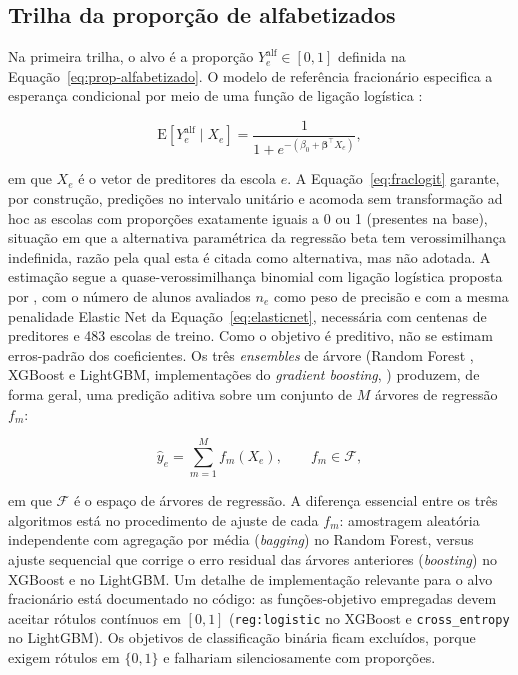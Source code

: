 \subsection{Trilha da proporção de alfabetizados}

Na primeira trilha, o alvo é a proporção $Y_e^{\text{alf}} \in [0,1]$
definida na Equação~\ref{eq:prop-alfabetizado}. O modelo de referência
fracionário especifica a esperança condicional por meio de uma função de
ligação logística \cite{papke1996fractional}:

\begin{equation}
    \mathrm{E}\left[Y_e^{\text{alf}} \mid X_e\right] = \frac{1}{1 + e^{-(\beta_0 + \boldsymbol{\beta}^\top X_e)}},
    \label{eq:fraclogit}
\end{equation}

em que $X_e$ é o vetor de preditores da escola $e$. A
Equação~\ref{eq:fraclogit} garante, por construção, predições no intervalo unitário e acomoda sem
transformação ad hoc as escolas com proporções exatamente iguais a 0 ou 1
(presentes na base), situação em que a alternativa paramétrica da
regressão beta \cite{ferrari2004beta} tem verossimilhança indefinida, razão
pela qual esta é citada como alternativa, mas não adotada. A estimação
segue a quase-verossimilhança binomial com ligação logística proposta por
, com o número de alunos avaliados $n_e$
como peso de precisão e com a mesma penalidade Elastic Net da
Equação~\ref{eq:elasticnet}, necessária com centenas de preditores e 483
escolas de treino. Como o objetivo é preditivo, não se estimam erros-padrão
dos coeficientes. Os três \textit{ensembles} de árvore
(Random Forest \cite{breiman2001random}, XGBoost e LightGBM,
implementações do \textit{gradient boosting},
) produzem, de forma geral, uma predição
aditiva sobre um conjunto de $M$ árvores de regressão $f_m$:

\begin{equation}
    \hat{y}_e = \sum_{m=1}^{M} f_m(X_e), \qquad f_m \in \mathcal{F},
    \label{eq:ensemble}
\end{equation}

em que $\mathcal{F}$ é o espaço de árvores de regressão. A diferença
essencial entre os três algoritmos está no procedimento de ajuste de cada
$f_m$: amostragem aleatória independente com agregação por média
(\textit{bagging}) no Random Forest, versus ajuste sequencial que corrige o
erro residual das árvores anteriores (\textit{boosting}) no XGBoost e no
LightGBM. Um detalhe de implementação relevante para o alvo fracionário
está documentado no código: as funções-objetivo empregadas devem aceitar
rótulos contínuos em $[0,1]$ (\texttt{reg:logistic} no XGBoost e
\texttt{cross\_entropy} no LightGBM). Os objetivos de classificação
binária ficam excluídos, porque exigem rótulos em $\{0,1\}$ e falhariam
silenciosamente com proporções.

